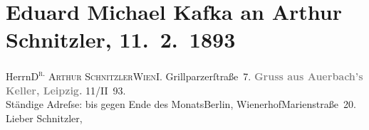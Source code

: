 

         
         \renewcommand{\erwaehntePersonen}{Personen: Josef Jarno, Eduard Michael Kafka, Angelo Neumann, Gilbert Otto Neumann-Hofer, Josef Simon, Johann Strauss}
         \renewcommand{\erwaehnteInstitutionen}{Institutionen: F. und P. Lehmann, Magazin für die Literatur des Auslandes, Saisontheater Ischl}
         \renewcommand{\erwaehnteOrte}{Orte: Auerbachs Keller, Bad Ischl, Berlin, Grillparzerstraße, I., Innere Stadt, Leipzig, Marienstraße, Prag, Raffaelova, Residenztheater Berlin, Wien, Wienerhof, Wilsonova}
         \renewcommand{\erwaehnteWerke}{Werke: Abschiedssouper, Anatol, Die Frage an das Schicksal}
               \section[Eduard Michael Kafka an Arthur Schnitzler, 11. 2. 1893]{ Eduard Michael Kafka an Arthur Schnitzler, 11. 2. 1893}\nopagebreak{}\rehead{ }\begin{ledgroupsized}[t]{13cm}\normalsize\beginnumbering \toendnotes[C]{\smallbreak\pagebreak[2]} 
\toendnotes[C]{\smallbreak}\pstart{}{\pb}Herrn\pend{}\pstart{}\textsc{D\textsuperscript{r.} Arthur Schnitzler}\pend{}\pstart{}\textsc{Wien}\pend{}\pstart{}I. Grillparzerſtraße 7. \pend{}{\bigskip}\pstart
           \noindent{}\centering{}{\pb}\textcolor{gray}{\textbf{Gruss aus Auerbach’s Keller,
                        Leipzig.}}\pend
           \pstart
           \raggedleft{}11/II 93.{\\}Ständige Adreſse: \introOben{}bis gegen Ende des
                     Monats\introOben{}{ }Berlin, WienerhofMarienstraße 20.\pend
           \pstart{}Lieber Schnitzler,\pend\pstart

\end{ledgroupsized}
